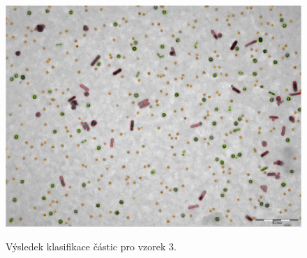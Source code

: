 \documentclass[11pt,twoside,a4paper,table]{book}
\begin{document}
\begin{figure}[h]
\center
\includegraphics[width=\textwidth]{figures/multi4_klasifikace.png}
\label{fig:class3}
\caption{Výsledek klasifikace částic pro vzorek 3.}
\end{figure}
\end{document}
